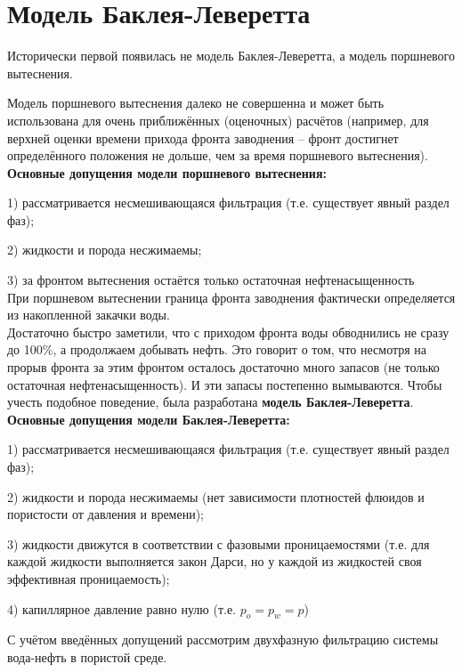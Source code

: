 \documentclass[a4paper,14pt]{extarticle}
\begin{document}
\section*{Модель Баклея-Леверетта}

Исторически первой появилась не модель Баклея-Леверетта, а модель поршневого вытеснения.

Модель поршневого вытеснения далеко не совершенна и может быть использована для очень приближённых (оценочных) расчётов (например, для верхней оценки времени прихода фронта заводнения -- фронт достигнет определённого положения не дольше, чем за время поршневого вытеснения).
\\

\textbf{Основные допущения модели поршневого вытеснения:}

1) рассматривается несмешивающаяся фильтрация (т.е. существует явный раздел фаз);

2) жидкости и порода несжимаемы;

3) за фронтом вытеснения остаётся только остаточная нефтенасыщенность
\\

При поршневом вытеснении граница фронта заводнения фактически определяется из накопленной закачки воды.
\\

Достаточно быстро заметили, что с приходом фронта воды обводнились не сразу до 100\%, а продолжаем добывать нефть.
Это говорит о том, что несмотря на прорыв фронта за этим фронтом осталось достаточно много запасов (не только остаточная нефтенасыщенность).
И эти запасы постепенно вымываются. Чтобы учесть подобное поведение, была разработана \textbf{модель Баклея-Леверетта}.
\\

\textbf{Основные допущения модели Баклея-Леверетта:}

1) рассматривается несмешивающаяся фильтрация (т.е. существует явный раздел фаз);

2) жидкости и порода несжимаемы (нет зависимости плотностей флюидов и пористости от давления и времени);

3) жидкости движутся в соответствии с фазовыми проницаемостями (т.е. для каждой жидкости выполняется закон Дарси, но у каждой из жидкостей своя эффективная проницаемость);

4) капиллярное давление равно нулю (т.е. $p_o=p_w=p$)

С учётом введённых допущений рассмотрим двухфазную фильтрацию системы вода-нефть в пористой среде.
\end{document}
